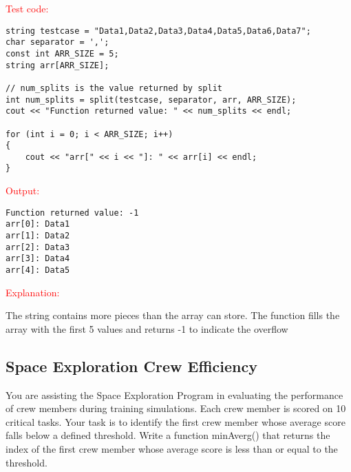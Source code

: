 \begin{sample}
\textcolor{red}{Test code:}
\begin{verbatim}
string testcase = "Data1,Data2,Data3,Data4,Data5,Data6,Data7";
char separator = ',';
const int ARR_SIZE = 5;
string arr[ARR_SIZE];

// num_splits is the value returned by split
int num_splits = split(testcase, separator, arr, ARR_SIZE);
cout << "Function returned value: " << num_splits << endl;

for (int i = 0; i < ARR_SIZE; i++)
{
    cout << "arr[" << i << "]: " << arr[i] << endl;
}
\end{verbatim}
\textcolor{red}{Output:}
\begin{verbatim}
Function returned value: -1  
arr[0]: Data1  
arr[1]: Data2  
arr[2]: Data3  
arr[3]: Data4  
arr[4]: Data5 
\end{verbatim}

\textcolor{red}{Explanation:}

The string contains more pieces than the array can store. The function fills the array with the first 5 values and returns -1 to indicate the overflow

\end{sample}

\subsection{Space Exploration Crew Efficiency}

You are assisting the Space Exploration Program in evaluating the performance of crew members during training simulations. Each crew member is scored on 10 critical tasks. Your task is to identify the first crew member whose average score falls below a defined threshold. Write a function minAverg() that returns the index of the first crew member whose average score is less than or equal to the threshold.

